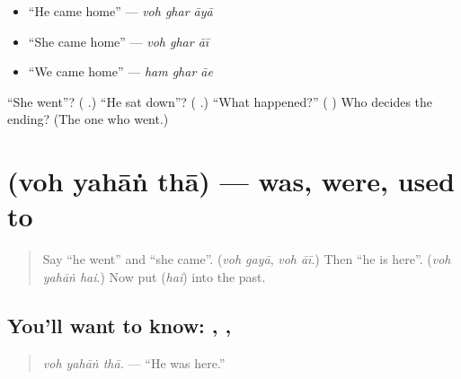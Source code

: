 \begin{itemize}
\raggedright
  \item \textquotedblleft{}He came home\textquotedblright{} — \emph{voh ghar āyā}
  \item \textquotedblleft{}She came home\textquotedblright{} — \emph{voh ghar āī}
  \item \textquotedblleft{}We came home\textquotedblright{} — \emph{ham ghar āe}
\end{itemize}

\begin{tcolorbox}[breakable,colback=teal!4,colframe=teal!35!black,title={Before you move on}]
\textquotedblleft{}She went\textquotedblright{}? (\textbf{ }.) \textquotedblleft{}He sat down\textquotedblright{}? (\textbf{ }.) \textquotedblleft{}What happened?\textquotedblright{} (\textbf{ }) Who decides the ending? (The one who went.)
\end{tcolorbox}
\section[\texorpdfstring{\ur{وہ} \ur{یہاں} \ur{تھا} (voh yahāṅ thā)}{وہ یہاں تھا (voh yahāṅ thā)}]{   (voh yahāṅ thā) — was, were, used to}

\label{lesson:UR-C264-voh-yahan-tha}



\begin{quote}
Say \textquotedblleft{}he went\textquotedblright{} and \textquotedblleft{}she came\textquotedblright{}. (\emph{voh gayā}, \emph{voh āī}.) Then \textquotedblleft{}he is here\textquotedblright{}. (\emph{voh yahāṅ hai}.) Now put \textbf{} (\emph{hai}) into the past.
\end{quote}

\subsection*{You'll want to know: , , }
\begin{quote}
\textbf{  }
\end{quote}

\begin{quote}
\emph{voh yahāṅ thā.} — \textquotedblleft{}He was here.\textquotedblright{}
\end{quote}

\begin{quote}
\textbf{  }
\end{quote}

